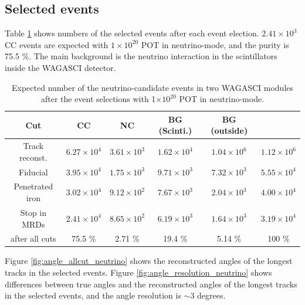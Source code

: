 \subsection{Selected events}

Table \ref{tab:expected_num_events_neutrino_beam} shows numbers of the selected events after each event election.
$2.41 \times 10^{3}$ CC events are expected with $1 \times 10^{20}$  POT in neutrino-mode, and the purity is 75.5 \%.
The main background is the neutrino interaction in the scintillators inside the WAGASCI detector.

\begin{table}[htb]
  \begin{center}
    \caption{Expected number of the neutrino-candidate events in two WAGASCI modules after the event selections with 1$\times 10^{20}$ POT in neutrino-mode.}
    \begin{tabular}{c|cccc|c} \hline
      Cut & CC & NC & BG (Scinti.) & BG (outside) \\ \hline
     Track reconst. & $6.27 \times 10^{4}$  & $3.61\times10^{3}$ & $1.62 \times10^{4}$ & $1.04 \times 10^{6}$ & $1.12 \times 10^{6}$ \\
     Fiducial & $3.95 \times 10^{4}$  & $1.75 \times10^{3}$ & $9.71 \times10^{3}$ & $7.32 \times 10^{3}$ & $5.55 \times 10^{4}$ \\
     Penetrated iron & $3.02 \times 10^{4}$  & $9.12 \times10^{2}$ & $7.67 \times10^{3}$ & $2.04 \times 10^{3}$ & $4.00 \times 10^{4}$ \\
     Stop in MRDs & $2.41 \times 10^{4}$  & $8.65 \times10^{2}$ & $6.19 \times10^{3}$ & $1.64 \times 10^{3}$ & $3.19 \times 10^{4}$ \\ \hline
     after all cuts & 75.5 \% & 2.71 \% & 19.4 \% & 5.14 \% & 100 \% \\
    \end{tabular}
    \label{tab:expected_num_events_neutrino_beam}
  \end{center}
\end{table}


Figure \ref{fig:angle_allcut_neutrino} shows the reconstructed angles of the longest tracks in the selected events.
Figure \ref{fig:angle_resolution_neutrino} shows differences between true angles and the reconstructed angles of the longest tracks in the selected events, and the angle resolution is $\sim$3 degrees.

